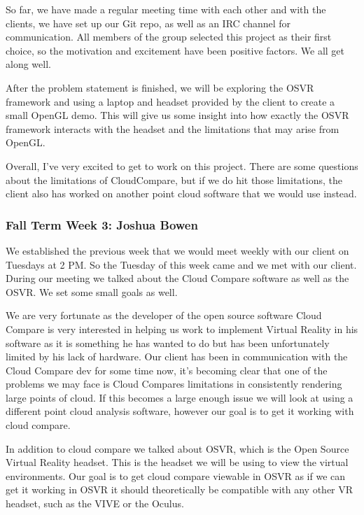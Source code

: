 \documentclass[draftclsnofoot,onecolumn]{IEEEtran}
\begin{document}
So far, we have made a regular meeting time with each other and with the clients, we have set up our Git repo, as well as an IRC channel for communication. 
All members of the group selected this project as their first choice, so the motivation and excitement have been positive factors. 
We all get along well.

After the problem statement is finished, we will be exploring the OSVR framework and using a laptop and headset provided by the client to create a small OpenGL demo. 
This will give us some insight into how exactly the OSVR framework interacts with the headset and the limitations that may arise from OpenGL.

Overall, I've very excited to get to work on this project. 
There are some questions about the limitations of CloudCompare, but if we do hit those limitations, the client also has worked on another point cloud software that we would use instead.

\subsubsection{Fall Term Week 3: Joshua Bowen}

We established the previous week that we would meet weekly with our client on Tuesdays at 2 PM. 
So the Tuesday of this week came and we met with our client. During our meeting we talked about the Cloud Compare software as well as the OSVR. 
We set some small goals as well.

We are very fortunate as the developer of the open source software Cloud Compare is very interested in helping us work to implement Virtual Reality in his software as it is something he has wanted to do but has been unfortunately limited by his lack of hardware. 
Our client has been in communication with the Cloud Compare dev for some time now, it's becoming clear that one of the problems we may face is Cloud Compares limitations in consistently rendering large points of cloud. 
If this becomes a large enough issue we will look at using a different point cloud analysis software, however our goal is to get it working with cloud compare.

In addition to cloud compare we talked about OSVR, which is the Open Source Virtual Reality headset. 
This is the headset we will be using to view the virtual environments. Our goal is to get cloud compare viewable in OSVR as if we can get it working in OSVR it should theoretically be compatible with any other VR headset, such as the VIVE or the Oculus.
\end{document}
